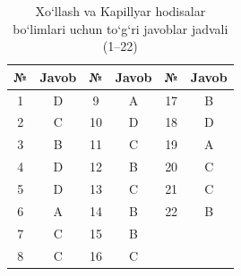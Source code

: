 \begin{table}[h!]
\centering
\caption{Xo‘llash va Kapillyar hodisalar bo‘limlari uchun to‘g‘ri javoblar jadvali (1--22)}
\begin{tabular}{|c|c|c|c|c|c|}
\hline
\textbf{№} & \textbf{Javob} & \textbf{№} & \textbf{Javob} & \textbf{№} & \textbf{Javob} \\ \hline
1 & D & 9 & A & 17 & B \\ \hline
2 & C & 10 & D & 18 & D \\ \hline
3 & B & 11 & C & 19 & A \\ \hline
4 & D & 12 & B & 20 & C \\ \hline
5 & D & 13 & C & 21 & C \\ \hline
6 & A & 14 & B & 22 & B \\ \hline
7 & C & 15 & B & & \\ \hline
8 & C & 16 & C & & \\ \hline
\end{tabular}
\end{table}
